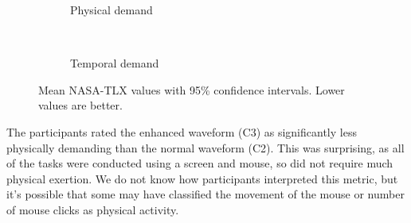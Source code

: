 \begin{figure}[p]
  \begin{subfigure}[t]{0.5\textwidth}
    \centering
    \caption{Physical demand}
  \end{subfigure}%
  ~
  \begin{subfigure}[t]{0.5\textwidth}
    \centering
    \caption{Temporal demand}
  \end{subfigure}%
  \caption{Mean NASA-TLX values with 95\% confidence intervals. Lower values are better.}
  \label{fig:tlx-results}
\end{figure}



The participants rated the enhanced waveform (C3) as significantly less physically demanding than the normal waveform
(C2).  This was surprising, as all of the tasks were conducted using a screen and mouse, so did not require much
physical exertion.  We do not know how participants interpreted this metric, but it's possible that some may have
classified the movement of the mouse or number of mouse clicks as physical activity.

